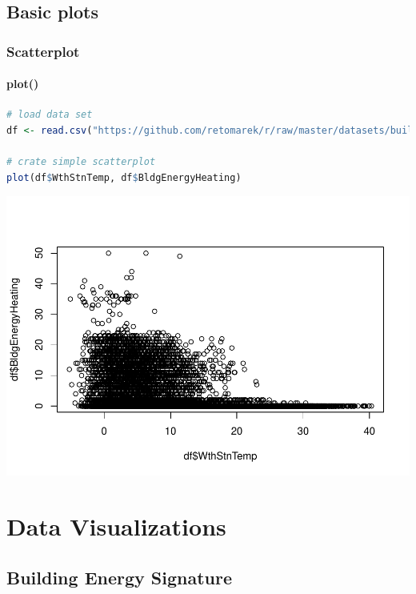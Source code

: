 \documentclass[
]{book}
\begin{document}
\hypertarget{basic-plots}{%
\section{Basic plots}\label{basic-plots}}

\hypertarget{scatterplot}{%
\subsection{Scatterplot}\label{scatterplot}}

\hypertarget{plot}{%
\subsubsection{plot()}\label{plot}}

\begin{lstlisting}[language=R]
# load data set
df <- read.csv("https://github.com/retomarek/r/raw/master/datasets/buildingMonitoringTestDataSet.csv", stringsAsFactors=FALSE, sep =",")

# crate simple scatterplot
plot(df$WthStnTemp, df$BldgEnergyHeating)
\end{lstlisting}

\includegraphics{edar_files/figure-latex/scatterplot plot-1.pdf}

\hypertarget{data-visualizations}{%
\chapter{Data Visualizations}\label{data-visualizations}}

\hypertarget{building-energy-signature}{%
\section{Building Energy Signature}\label{building-energy-signature}}
\end{document}
